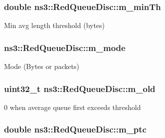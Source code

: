\subsubsection[{\texorpdfstring{m\+\_\+min\+Th}{m_minTh}}]{\setlength{\rightskip}{0pt plus 5cm}double ns3\+::\+Red\+Queue\+Disc\+::m\+\_\+min\+Th\hspace{0.3cm}{\ttfamily [private]}}\hypertarget{classns3_1_1RedQueueDisc_a6c2f13710a589ca7a43e06d16bd889ee}{}\label{classns3_1_1RedQueueDisc_a6c2f13710a589ca7a43e06d16bd889ee}


Min avg length threshold (bytes) 

\subsubsection[{\texorpdfstring{m\+\_\+mode}{m_mode}}]{ ns3\+::\+Red\+Queue\+Disc\+::m\+\_\+mode\hspace{0.3cm}{\ttfamily [private]}}\hypertarget{classns3_1_1RedQueueDisc_aaff7adacb9ec0949e8e867fa27ea6c2c}{}\label{classns3_1_1RedQueueDisc_aaff7adacb9ec0949e8e867fa27ea6c2c}


Mode (Bytes or packets) 

\subsubsection[{\texorpdfstring{m\+\_\+old}{m_old}}]{\setlength{\rightskip}{0pt plus 5cm}uint32\+\_\+t ns3\+::\+Red\+Queue\+Disc\+::m\+\_\+old\hspace{0.3cm}{\ttfamily [private]}}\hypertarget{classns3_1_1RedQueueDisc_a4a559e37f94d5f957a436fdcadd18bbb}{}\label{classns3_1_1RedQueueDisc_a4a559e37f94d5f957a436fdcadd18bbb}


0 when average queue first exceeds threshold 

\subsubsection[{\texorpdfstring{m\+\_\+ptc}{m_ptc}}]{\setlength{\rightskip}{0pt plus 5cm}double ns3\+::\+Red\+Queue\+Disc\+::m\+\_\+ptc\hspace{0.3cm}{\ttfamily [private]}}\hypertarget{classns3_1_1RedQueueDisc_aa0e1d78172897574d39e59b873ec9401}{}\label{classns3_1_1RedQueueDisc_aa0e1d78172897574d39e59b873ec9401}


